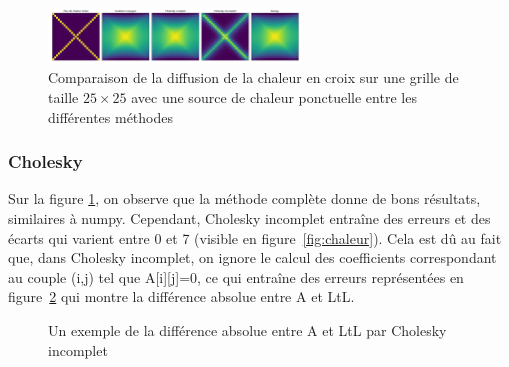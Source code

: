 \documentclass{article}
\begin{document}
\begin{figure}[h!]
  \begin{center}
    \includegraphics[width=0.6\textwidth]{img/compare_vis.png}
    \caption{Comparaison de la diffusion de la chaleur en croix sur une grille de taille \(25 \times 25\) avec une source de chaleur ponctuelle entre les différentes méthodes}
    \label{fig:all_methods}
  \end{center}
  \vspace{-1cm}
\end{figure}
\subsubsection{Cholesky}
\begin{multicols}{2}
  Sur la figure \ref{fig:all_methods}, on observe que la méthode complète donne de bons résultats, similaires à numpy. Cependant, Cholesky incomplet entraîne des erreurs et des écarts qui varient entre 0 et 7 (visible en figure~\ref{fig:chaleur}). Cela est dû au fait que, dans Cholesky incomplet, on ignore le calcul des coefficients correspondant au couple (i,j) tel que A[i][j]=0, ce qui entraîne des erreurs représentées en figure~\ref{fig:err_ch} qui montre la différence absolue entre A et LtL.
  \begin{figure}[H]
    \begin{center}
      \caption{Un exemple de la différence absolue entre A et LtL par Cholesky incomplet}
      \label{fig:err_ch}
    \end{center}
  \end{figure}
\end{multicols}
\end{document}

